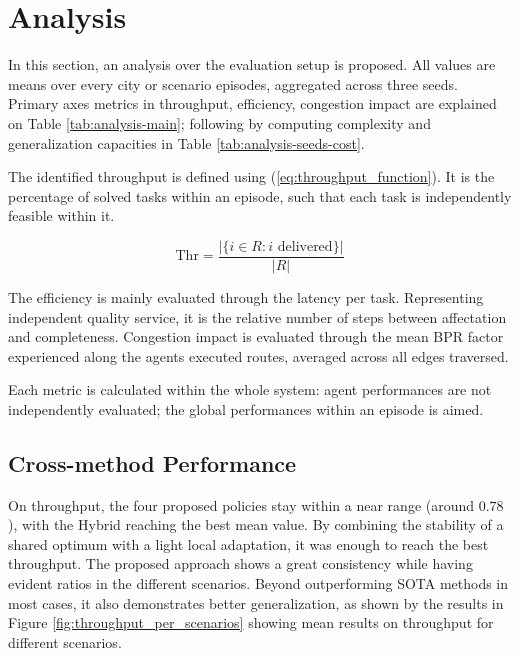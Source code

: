 \documentclass[sigconf]{acmart}
\begin{document}
\section{Analysis}
\label{sec:analysis}

In this section, an analysis over the evaluation setup is proposed. All values are means over every city or scenario episodes, aggregated across three seeds. Primary axes metrics in throughput, efficiency, congestion impact are explained on Table \ref{tab:analysis-main}; following by computing complexity and generalization capacities in Table \ref{tab:analysis-seeds-cost}.

The identified throughput is defined using (\ref{eq:throughput_function}). It is the percentage of solved tasks within an episode, such that each task is independently feasible within it.

\begin{equation}
\text{Thr} = \frac{|\{i \in R : i \text{ delivered}\}|}{|R|}
\label{eq:throughput_function}
\end{equation}

The efficiency is mainly evaluated through the latency per task. Representing independent quality service, it is the relative number of steps between affectation and completeness. Congestion impact is evaluated through the mean BPR factor experienced along the agents executed routes, averaged across all edges traversed.

Each metric is calculated within the whole system: agent performances are not independently evaluated; the global performances within an episode is aimed.

\subsection{Cross-method Performance}

On throughput, the four proposed policies stay within a near range (around $0.78$), with the Hybrid reaching the best mean value. By combining the stability of a shared optimum with a light local adaptation, it was enough to reach the best throughput. The proposed approach shows a great consistency while having evident ratios in the different scenarios. Beyond outperforming SOTA methods in most cases, it also demonstrates better generalization, as shown by the results in Figure \ref{fig:throughput_per_scenarios} showing mean results on throughput for different scenarios.
\end{document}
